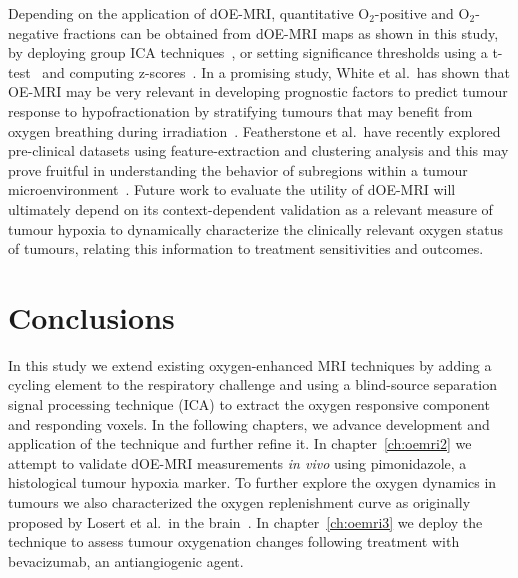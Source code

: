 Depending on the application of \acs{dOE-MRI}, quantitative O$_2$-positive and O$_2$-negative fractions can be obtained from \acs{dOE-MRI} maps as shown in this study, by deploying group \acs{ICA} techniques~\cite{Calhoun:2009jr}, or setting significance thresholds using a t-test~\cite{Greicius:2004ck} and computing z-scores~\cite{McKeown:1998wd}.
In a promising study, White et al.\ has shown that OE-MRI may be very relevant in developing prognostic factors to predict tumour response to hypofractionation by stratifying tumours that may benefit from oxygen breathing during irradiation~\cite{White:2016fz}.
Featherstone et al.\ have recently explored pre-clinical datasets using feature-extraction and clustering analysis and this may prove fruitful in understanding the behavior of subregions within a tumour microenvironment~\cite{Featherstone:2018cn}.
Future work to evaluate the utility of \acs{dOE-MRI} will ultimately depend on its context-dependent validation as a relevant measure of tumour hypoxia to dynamically characterize the clinically relevant oxygen status of tumours, relating this information to treatment sensitivities and outcomes.

\section{Conclusions}
In this study we extend existing oxygen-enhanced MRI techniques by adding a cycling element to the respiratory challenge and using a blind-source separation signal processing technique (\acs{ICA}) to extract the oxygen responsive component and responding voxels.
In the following chapters, we advance development and application of the technique and further refine it. 
In chapter~\ref{ch:oemri2} we attempt to validate \acs{dOE-MRI} measurements \emph{in vivo} using pimonidazole, a histological tumour hypoxia marker.
To further explore the oxygen dynamics in tumours we also characterized the oxygen replenishment curve as originally proposed by Losert et al.\ in the brain~\cite{Losert:2002gt}.
In chapter~\ref{ch:oemri3} we deploy the technique to assess tumour oxygenation changes following treatment with bevacizumab, an antiangiogenic agent.

\endinput
